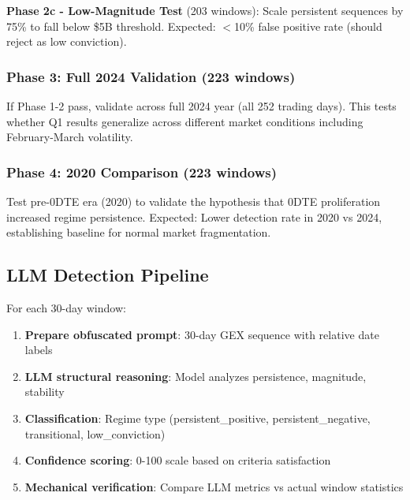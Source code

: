 \vspace{0.1cm}

\noindent\textbf{Phase 2c - Low-Magnitude Test} (203 windows): Scale persistent sequences by 75\% to fall below \$5B threshold. Expected: $<$10\% false positive rate (should reject as low conviction).

\vspace{0.2cm}

\subsubsection{Phase 3: Full 2024 Validation (223 windows)}

If Phase 1-2 pass, validate across full 2024 year (all 252 trading days). This tests whether Q1 results generalize across different market conditions including February-March volatility.

\vspace{0.2cm}

\subsubsection{Phase 4: 2020 Comparison (223 windows)}

Test pre-0DTE era (2020) to validate the hypothesis that 0DTE proliferation increased regime persistence. Expected: Lower detection rate in 2020 vs 2024, establishing baseline for normal market fragmentation.

\subsection{LLM Detection Pipeline}

For each 30-day window:

\begin{enumerate}
\item \textbf{Prepare obfuscated prompt}: 30-day GEX sequence with relative date labels
\item \textbf{LLM structural reasoning}: Model analyzes persistence, magnitude, stability
\item \textbf{Classification}: Regime type (persistent\_positive, persistent\_negative, transitional, low\_conviction)
\item \textbf{Confidence scoring}: 0-100 scale based on criteria satisfaction
\item \textbf{Mechanical verification}: Compare LLM metrics vs actual window statistics
\end{enumerate}

